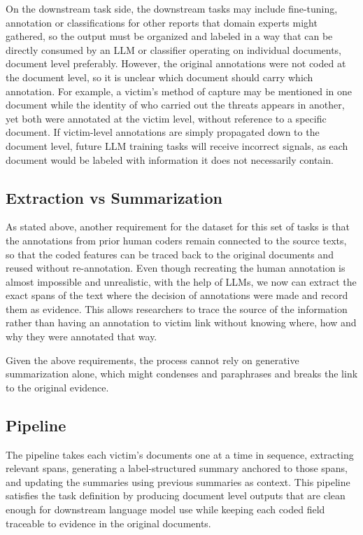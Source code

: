 \documentclass{article}
\begin{document}
On the downstream task side, the downstream tasks may include fine-tuning, annotation or classifications for other reports that domain experts might gathered, so the output must be organized and labeled in a way that can be directly consumed by an LLM or classifier operating on individual documents, document level preferably. However, the original annotations were not coded at the document level, so it is unclear which document should carry which annotation. For example, a victim's method of capture may be mentioned in one document while the identity of who carried out the threats appears in another, yet both were annotated at the victim level, without reference to a specific document. If victim-level annotations are simply propagated down to the document level, future LLM training tasks will receive incorrect signals, as each document would be labeled with information it does not necessarily contain.

\subsection{Extraction vs
Summarization}\label{extraction-vs-summarization}

As stated above, another requirement for the dataset for this set of
tasks is that the annotations from prior human coders remain connected
to the source texts, so that the coded features can be traced back to
the original documents and reused without re-annotation. Even though
recreating the human annotation is almost impossible and unrealistic,
with the help of LLMs, we now can extract the exact spans of the text
where the decision of annotations were made and record them as evidence.
This allows researchers to trace the source of the information rather
than having an annotation to victim link without knowing where, how and
why they were annotated that way.

Given the above requirements, the process cannot rely on generative
summarization alone, which might condenses and paraphrases and breaks
the link to the original evidence.

\subsection{Pipeline}\label{pipeline}

The pipeline takes each victim's documents one at a time in sequence,
extracting relevant spans, generating a label-structured summary
anchored to those spans, and updating the summaries using previous
summaries as context. This pipeline satisfies the task definition by
producing document level outputs that are clean enough for downstream
language model use while keeping each coded field traceable to evidence
in the original documents.
\end{document}

